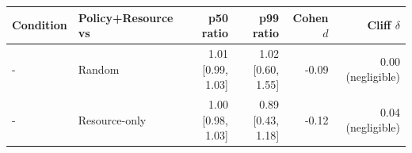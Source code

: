 \begin{tabular}{llrrrr}
\toprule
Condition & Policy+Resource vs & p50 ratio & p99 ratio & Cohen $d$ & Cliff $\delta$ \\
\midrule
- & Random & 1.01 [0.99, 1.03] & 1.02 [0.60, 1.55] & -0.09 & 0.00 (negligible) \\
- & Resource-only & 1.00 [0.98, 1.03] & 0.89 [0.43, 1.18] & -0.12 & 0.04 (negligible) \\
\bottomrule
\end{tabular}
